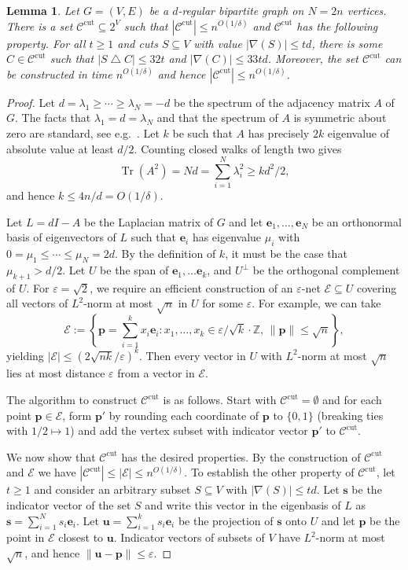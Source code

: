 \documentclass[11pt,letterpaper]{amsart}
\newtheorem{lemma}[theorem]{Lemma}
\theoremstyle{definition}
\newcommand*{\lam}{\lambda}
\newcommand{\eps}{\varepsilon}
\renewcommand{\subset}{\subseteq}
\let\oldtriangle\triangle
\def\triangle{\mathbin{\oldtriangle}}
\newcommand*{\Ccut}{\mathcal{C}^{\mathrm{cut}}}
\DeclareMathOperator{\Tr}{Tr}
\begin{document}
\begin{lemma}\label{lem:enumeratecuts}
Let $G=(V,E)$ be a $d$-regular bipartite graph on $N=2n$ vertices. 
There is a set $\Ccut\subset 2^V$ such that $|\Ccut|\le n^{O(1/\delta)}$ and $\Ccut$ has the following property.
For all $t\ge 1$ and cuts $S\subset V$ with value $|\nabla(S)|\le td$, there is some $C \in \Ccut$ such that $|S \triangle C| \leq 32t$ and $|\nabla(C)|\le 33td$.
Moreover, the set $\Ccut$ can be constructed in time $n^{O(1/\delta)}$ and hence $|\Ccut|\le n^{O(1/\delta)}$.
\end{lemma}

\begin{proof}
Let $d = \lam_1 \ge \dotsb \ge \lam_{N} = -d$ be the spectrum of the adjacency matrix $A$ of $G$. The facts that $\lam_1=d=\lam_{N}$ and that the spectrum of $A$ is symmetric about zero are standard, see e.g.~\cite{C96}.
Let $k$ be such that $A$ has precisely $2k$ eigenvalue of absolute value at least $d/2$.
Counting closed walks of length two gives
\[ \Tr(A^2) = Nd = \sum_{i=1}^N \lam_i^2 \ge k d^2/2,\]
and hence $k \le 4n/d=O(1/\delta)$.

Let $L=dI-A$ be the Laplacian matrix of $G$ and let $\mathbf e_1,\dotsc,\mathbf e_{N}$ be an orthonormal basis of eigenvectors of $L$ such that $\mathbf e_i$ has eigenvalue $\mu_i$ with $0 = \mu_1 \le \dotsb \le \mu_N = 2d$. 
By the definition of $k$, it must be the case that $\mu_{k+1} > d/2$.
Let $U$ be the span of $\mathbf e_1,\dotsc \mathbf e_k$, and $U^\perp$ be the orthogonal complement of $U$.
For $\eps=\sqrt{2}$, we require an efficient construction of an $\eps$-net $\mathcal E\subset U$ covering all vectors of $L^2$-norm at most $\sqrt n$ in $U$ for some $\eps$. 
For example, we can take 
\[ \mathcal E:= \left\{ \mathbf p = \sum_{i=1}^k x_i\mathbf e_i : x_1,\dotsc,x_k\in \eps/\sqrt{k}\cdot \mathbb{Z},\, \|\mathbf p\|\le \sqrt n \right\},\]
yielding $|\mathcal E|\le (2\sqrt{nk}/\eps)^k$. 
Then every vector in $U$ with $L^2$-norm at most $\sqrt n$ lies at most distance $\eps$ from a vector in $\mathcal E$.

The algorithm to construct $\Ccut$ is as follows. Start with $\Ccut = \emptyset$ and 
for each point $\mathbf{p}\in \mathcal E$, form $\mathbf{p}'$ by rounding each coordinate of $\mathbf{p}$ to $\{0,1\}$ (breaking ties with $1/2 \mapsto 1$) and add the vertex subset with indicator vector $\mathbf p'$ to $\Ccut$.

We now show that $\Ccut$ has the desired properties. 
By the construction of $\Ccut$ and $\mathcal E$ we have $|\Ccut| \le |\mathcal E| \le n^{O(1/\delta)}$.
To establish the other property of $\Ccut$, let $t\ge 1$ and consider an arbitrary subset $S\subset V$ with $|\nabla(S)|\le td$.
Let $\mathbf s$ be the indicator vector of the set $S$ and write this vector in the eigenbasis of $L$ as $\mathbf s =\sum_{i=1}^N s_i \mathbf e_i$. 
Let $\mathbf u = \sum_{i=1}^k s_i \mathbf e_i$ be the projection of $\mathbf s$ onto $U$ and let $\mathbf p$ be the point in $\mathcal E$ closest to $\mathbf u$.
Indicator vectors of subsets of $V$ have $L^2$-norm at most $\sqrt n$, and hence $\|\mathbf u-\mathbf p\|\le \eps$.


\end{proof}
\end{document}

